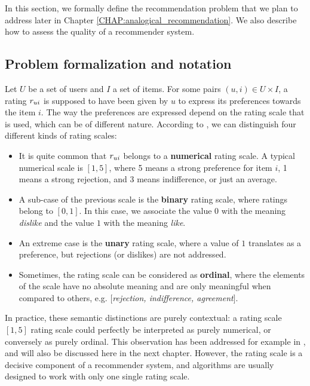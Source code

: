 In this section, we formally define the recommendation problem that we plan to
address later in Chapter \ref{CHAP:analogical_recommendation}. We also describe
how to assess the quality of a recommender system.

\subsection{Problem formalization and notation}
Let $U$ be a set of users and $I$ a set of items. For some pairs $(u,i) \in U
\times I$, a rating  $r_{ui}$ is supposed to have been given by $u$ to express
its preferences towards the item $i$. The way the preferences are expressed
depend on the rating scale that is used, which can be of different nature.
According to \cite{SchFraHerSen07}, we can distinguish four different kinds of
rating scales:

\begin{itemize}
  \item It is quite common that  $r_{ui}$ belongs to a \textbf{numerical} rating
    scale. A typical numerical scale is $[1, 5]$, where  5 means a strong
    preference for item $i$, 1 means a strong rejection, and 3 means
    indifference, or just an average.
  \item A sub-case of the previous scale is the \textbf{binary} rating scale,
    where ratings belong to $[0, 1]$. In this case, we associate the value $0$
    with the meaning \textit{dislike} and the value $1$ with the meaning
    \textit{like}.
  \item An extreme case is the \textbf{unary} rating scale, where a value of
    $1$ translates as a preference, but rejections (or dislikes) are not
    addressed.
  \item Sometimes, the rating scale can be considered as \textbf{ordinal},
    where the elements of the scale have no absolute meaning and are only
    meaningful when compared to others, e.g. $[$\textit{rejection, indifference,
    agreement}$]$.
\end{itemize}
In practice, these semantic distinctions are purely contextual: a rating
scale $[1, 5]$ rating scale could perfectly be interpreted as purely numerical,
or conversely as purely ordinal. This observation has been addressed for
example in \cite{KorSillRECSYS11}, and will also be discussed here in the next
chapter. However, the rating scale is a decisive component of a recommender
system, and algorithms are usually designed to work with only one single rating
scale.

